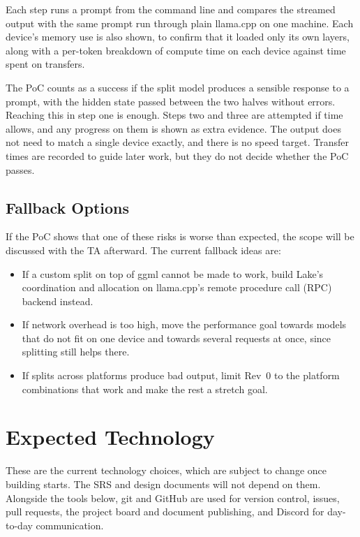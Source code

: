 \documentclass{article}
\begin{document}
Each step runs a prompt from the command line and compares the streamed output
with the same prompt run through plain llama.cpp on one machine. Each device's
memory use is also shown, to confirm that it loaded only its own layers, along
with a per-token breakdown of compute time on each device against time spent
on transfers.

The PoC counts as a success if the split model produces a sensible response
to a prompt, with the hidden state passed between the two halves without
errors. Reaching this in step one is enough. Steps two and three are attempted
if time allows, and any progress on them is shown as extra evidence. The output
does not need to match a single device exactly, and there is no speed target.
Transfer times are recorded to guide later work, but they do not decide
whether the PoC passes.

\subsection{Fallback Options}

If the PoC shows that one of these risks is worse than expected, the scope
will be discussed with the TA afterward. The current fallback ideas are:

\begin{itemize}
  \item If a custom split on top of ggml cannot be made to work, build Lake's
    coordination and allocation on llama.cpp's remote procedure call (RPC)
    backend instead.
  \item If network overhead is too high, move the performance goal towards
    models that do not fit on one device and towards several requests at once,
    since splitting still helps there.
  \item If splits across platforms produce bad output, limit Rev~0 to the
    platform combinations that work and make the rest a stretch goal.
\end{itemize}

\section{Expected Technology}
\label{SecTech}

These are the current technology choices, which are subject to change once
building starts. The SRS and design documents will not depend on them.
Alongside the tools below, git and GitHub are used for version control,
issues, pull requests, the project board and document publishing, and Discord
for day-to-day communication.
\end{document}
